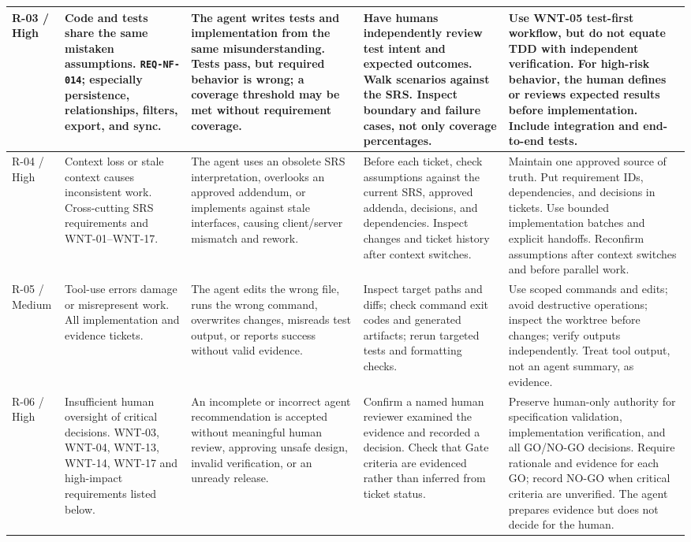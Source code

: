 \documentclass[10pt,a4paper]{article}
\begin{document}
\begin{longtable}{|L{1.15cm}|L{3.1cm}|L{5.6cm}|L{4.4cm}|L{7.1cm}|}
R-03 / High &
Code and tests share the same mistaken assumptions. \texttt{REQ-NF-014}; especially persistence, relationships, filters, export, and sync. &
The agent writes tests and implementation from the same misunderstanding. Tests pass, but required behavior is wrong; a coverage threshold may be met without requirement coverage. &
Have humans independently review test intent and expected outcomes. Walk scenarios against the SRS. Inspect boundary and failure cases, not only coverage percentages. &
Use WNT-05 test-first workflow, but do not equate TDD with independent verification. For high-risk behavior, the human defines or reviews expected results before implementation. Include integration and end-to-end tests. \\
\hline

R-04 / High &
Context loss or stale context causes inconsistent work. Cross-cutting SRS requirements and WNT-01--WNT-17. &
The agent uses an obsolete SRS interpretation, overlooks an approved addendum, or implements against stale interfaces, causing client/server mismatch and rework. &
Before each ticket, check assumptions against the current SRS, approved addenda, decisions, and dependencies. Inspect changes and ticket history after context switches. &
Maintain one approved source of truth. Put requirement IDs, dependencies, and decisions in tickets. Use bounded implementation batches and explicit handoffs. Reconfirm assumptions after context switches and before parallel work. \\
\hline

R-05 / Medium &
Tool-use errors damage or misrepresent work. All implementation and evidence tickets. &
The agent edits the wrong file, runs the wrong command, overwrites changes, misreads test output, or reports success without valid evidence. &
Inspect target paths and diffs; check command exit codes and generated artifacts; rerun targeted tests and formatting checks. &
Use scoped commands and edits; avoid destructive operations; inspect the worktree before changes; verify outputs independently. Treat tool output, not an agent summary, as evidence. \\
\hline

R-06 / High &
Insufficient human oversight of critical decisions. WNT-03, WNT-04, WNT-13, WNT-14, WNT-17 and high-impact requirements listed below. &
An incomplete or incorrect agent recommendation is accepted without meaningful human review, approving unsafe design, invalid verification, or an unready release. &
Confirm a named human reviewer examined the evidence and recorded a decision. Check that Gate criteria are evidenced rather than inferred from ticket status. &
Preserve human-only authority for specification validation, implementation verification, and all GO/NO-GO decisions. Require rationale and evidence for each GO; record NO-GO when critical criteria are unverified. The agent prepares evidence but does not decide for the human. \\
\hline


\end{longtable}
\end{document}
